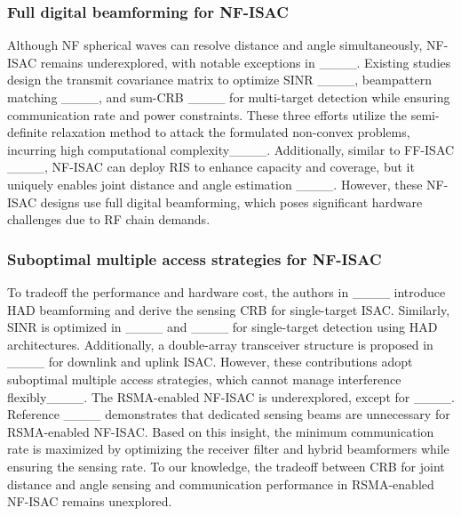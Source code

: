 \subsubsection{Full digital beamforming for NF-ISAC}
Although NF spherical waves can resolve distance and angle simultaneously, NF-ISAC remains underexplored, with notable exceptions in ____. Existing studies design the transmit covariance matrix to optimize SINR ____, beampattern matching ____, and sum-CRB ____ for multi-target detection while ensuring communication rate and power constraints. These three efforts utilize the semi-definite relaxation method to attack the formulated non-convex problems, incurring high computational complexity____. Additionally, similar to FF-ISAC ____, NF-ISAC can deploy RIS to enhance capacity and coverage, but it uniquely enables joint distance and angle estimation ____. However, these NF-ISAC designs use full digital beamforming, which poses significant hardware challenges due to RF chain demands. 

 \subsubsection{Suboptimal multiple access strategies for NF-ISAC} To tradeoff the performance and hardware cost, the authors in ____ introduce HAD beamforming and derive the sensing CRB for single-target ISAC. Similarly, SINR is optimized in ____ and ____ 
 for single-target detection using HAD architectures. Additionally, a double-array transceiver structure is proposed in ____  for downlink and uplink ISAC. However, these contributions adopt suboptimal multiple access strategies, which cannot manage interference flexibly____. The RSMA-enabled NF-ISAC is underexplored, except for ____. Reference ____ demonstrates that dedicated sensing beams are unnecessary for RSMA-enabled NF-ISAC. Based on this insight, the minimum communication rate is maximized by optimizing the receiver filter and hybrid beamformers while ensuring the sensing rate. To our knowledge, the tradeoff between CRB for joint distance and angle sensing and communication performance in RSMA-enabled NF-ISAC remains unexplored.